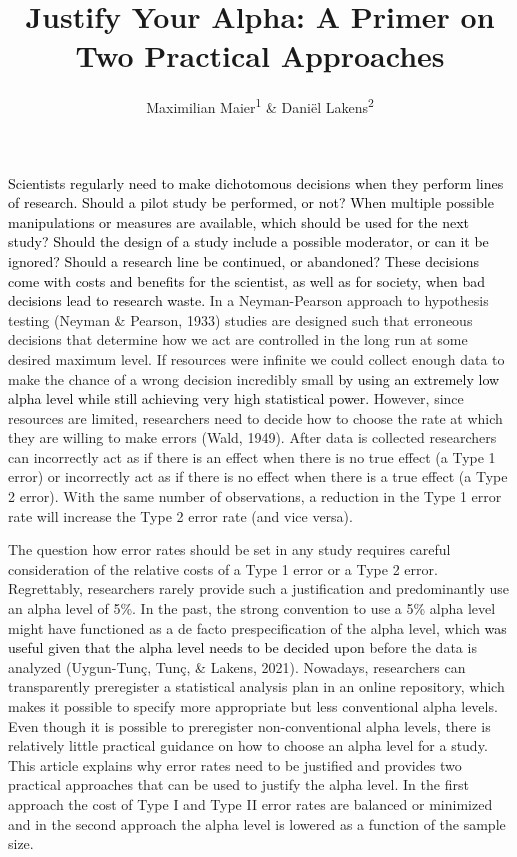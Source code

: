 \documentclass[
  english,
  ,man, a4paper,floatsintext]{apa6}
\title{Justify Your Alpha: A Primer on Two Practical Approaches}
\author{Maximilian Maier\textsuperscript{1} \& Daniël Lakens\textsuperscript{2}}
\date{}
\affiliation{\vspace{0.5cm}\textsuperscript{1} University College London, United Kingdom\\\textsuperscript{2} Eindhoven University of Technology, The Netherlands}
\begin{document}
\maketitle

\textcolor{black}{Scientists regularly need to make dichotomous decisions when they perform lines of research. Should a pilot study be performed, or not? When multiple possible manipulations or measures are available, which should be used for the next study? Should the design of a study include a possible moderator, or can it be ignored? Should a research line be continued, or abandoned? These decisions come with costs and benefits for the scientist, as well as for society, when bad decisions lead to research waste.} In a Neyman-Pearson approach to hypothesis testing (Neyman \& Pearson, 1933) studies are designed such that erroneous decisions that determine how we act are controlled in the long run at some desired maximum level. If resources were infinite we could collect enough data to make the chance of a wrong decision incredibly small \textcolor{black}{by using an extremely low alpha level while still achieving very high statistical power.} However, since resources are limited, researchers need to decide how to choose the rate at which they are willing to make errors (Wald, 1949). After data is collected researchers can incorrectly act as if there is an effect when there is no true effect (a Type 1 error) or incorrectly act as if there is no effect when there is a true effect (a Type 2 error). With the same number of observations, a reduction in the Type 1 error rate will increase the Type 2 error rate (and vice versa).

The question how error rates should be set in any study requires careful consideration of the relative costs of a Type 1 error or a Type 2 error. Regrettably, researchers rarely provide such a justification and predominantly use an alpha level of 5\%. In the past, the strong convention to use a 5\% alpha level might have functioned as a de facto prespecification of the alpha level, which \textcolor{black}{was useful given that the alpha level needs to be decided upon} before the data is analyzed (Uygun-Tunç, Tunç, \& Lakens, 2021). Nowadays, researchers can transparently preregister a statistical analysis plan in an online repository, which makes it possible to specify more appropriate but less conventional alpha levels. Even though it is possible to preregister non-conventional alpha levels, there is relatively little practical guidance on how to choose an alpha level for a study. This article explains why error rates need to be justified and provides two practical approaches that can be used to justify the alpha level. In the first approach the cost of Type I and Type II error rates are balanced or minimized and in the second approach the alpha level is lowered as a function of the sample size.
\end{document}
